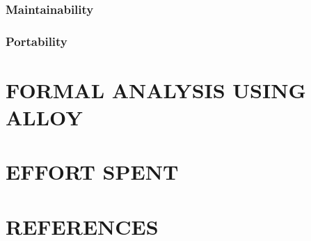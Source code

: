 \documentclass{article}
\begin{document}
\subsubsection{Maintainability}
\subsubsection{Portability}

\section{FORMAL ANALYSIS USING ALLOY}

\section{EFFORT SPENT}

\section{REFERENCES}
\end{document}
